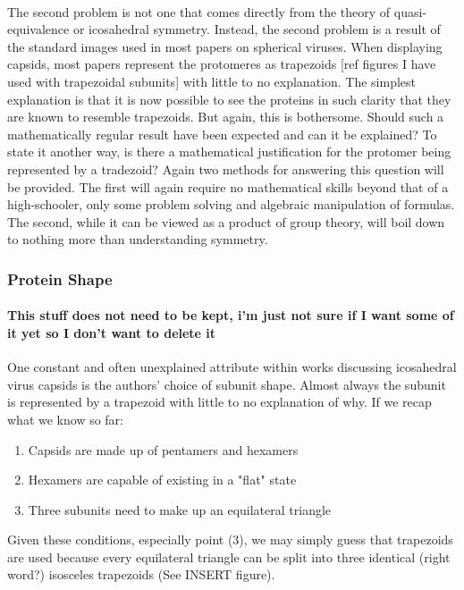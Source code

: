 \documentclass[12pt,letter]{article}
\begin{document}
\paragraph{}
The second problem is not one that comes directly from the theory of quasi-equivalence or icosahedral symmetry. Instead, the second problem is a result of the standard images used in most papers on spherical viruses. When displaying capsids, most papers represent the protomeres as trapezoids [ref figures I have used with trapezoidal subunits] with little to no explanation. The simplest explanation is that it is now possible to see the proteins in such clarity that they are known to resemble trapezoids. But again, this is bothersome. Should such a mathematically regular result have been expected and can it be explained? To state it another way, is there a mathematical justification for the protomer being represented by a tradezoid? Again two methods for answering this question will be provided. The first will again require no mathematical skills beyond that of a high-schooler, only some problem solving and algebraic manipulation of formulas. The second, while it can be viewed as a product of group theory, will boil down to nothing more than understanding symmetry.

\subsubsection{Protein Shape}

\paragraph{This stuff does not need to be kept, i'm just not sure if I want some of it yet so I don't want to delete it}
One constant and often unexplained attribute within works discussing icosahedral virus capsids is the authors' choice of subunit shape. Almost always the subunit is represented by a trapezoid with little to no explanation of why. If we recap what we know so far:
\begin{enumerate}
	\item Capsids are made up of pentamers and hexamers
	\item Hexamers are capable of existing in a "flat" state
	\item Three subunits need to make up an equilateral triangle
\end{enumerate}
Given these conditions, especially point (3), we may simply guess that trapezoids are used because every equilateral triangle can be split into three identical (right word?) isosceles trapezoids (See INSERT figure). 
\end{document}
